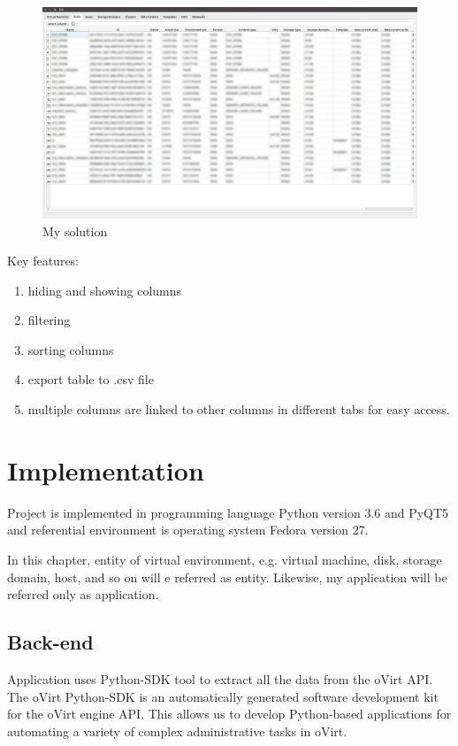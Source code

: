 \begin{figure}[H]
\centering
\includegraphics[scale=0.2]{tabulka.jpg}
\caption{My solution}
\end{figure}

Key features:
\begin{enumerate}
\item hiding and showing columns
\item filtering
\item sorting columns
\item export table to .csv file
\item multiple columns are linked to other columns in different tabs for easy access.
\end{enumerate}


\chapter{Implementation} \label{chap_implementation}
Project is implemented in programming language Python version 3.6 and PyQT5 and referential environment is operating system Fedora version 27.

In this chapter, entity of virtual environment, e.g. virtual machine, disk, storage domain, host, and so on will e referred as entity. Likewise, my application will be referred only as application.

\section{Back-end}
Application uses Python-SDK tool to extract all the data from the oVirt API. The oVirt Python-SDK is an automatically generated software development kit for the oVirt engine API. This allows us to develop Python-based applications for automating a variety of complex administrative tasks in oVirt.

